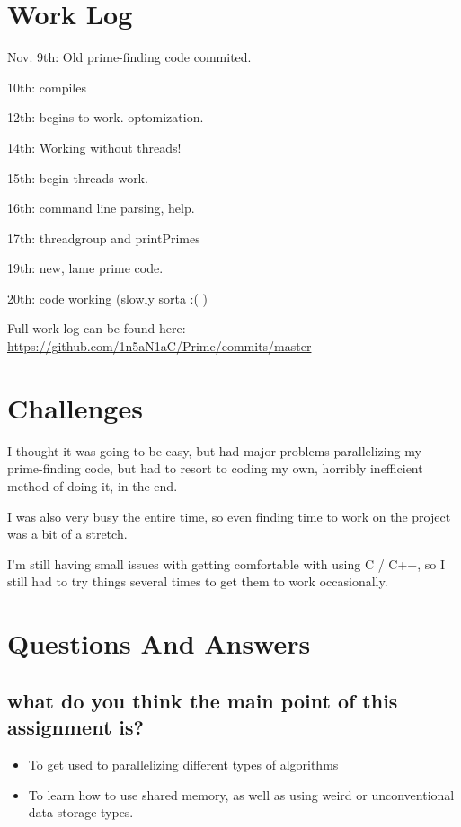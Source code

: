 \documentclass[letterpaper,10pt,titlepage]{article}
\begin{document}
\section{Work Log}

Nov. 9th:  Old prime-finding code commited.  

10th: compiles

12th: begins to work.  optomization.

14th: Working without threads!

15th: begin threads work.

16th: command line parsing, help.

17th: threadgroup and printPrimes

19th: new, lame prime code.

20th: code working (slowly sorta :( )

Full work log can be found here:
\url{https://github.com/1n5aN1aC/Prime/commits/master}

\section{Challenges}

I thought it was going to be easy, but had major problems parallelizing  my prime-finding code, but had to resort to coding my own, horribly inefficient method of doing it, in the end.

I was also very busy the entire time, so even finding time to work on the project was a bit of a stretch.

I'm still having small issues with getting comfortable  with using C / C++, so I still had to try things several times to get them to work occasionally.

\section{Questions And Answers}

\subsection{what do you think the main point of this assignment is?}

\begin{itemize}
\item To get used to parallelizing different types of algorithms
\item To learn how to use shared memory, as well as using weird or unconventional data storage types.
\end{itemize}
\end{document}
